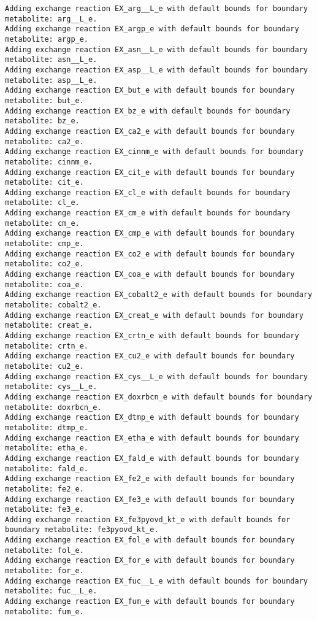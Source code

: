 \documentclass[
  letterpaper,
  DIV=11,
  numbers=noendperiod]{scrartcl}
\begin{document}
\begin{verbatim}
Adding exchange reaction EX_arg__L_e with default bounds for boundary metabolite: arg__L_e.
Adding exchange reaction EX_argp_e with default bounds for boundary metabolite: argp_e.
Adding exchange reaction EX_asn__L_e with default bounds for boundary metabolite: asn__L_e.
Adding exchange reaction EX_asp__L_e with default bounds for boundary metabolite: asp__L_e.
Adding exchange reaction EX_but_e with default bounds for boundary metabolite: but_e.
Adding exchange reaction EX_bz_e with default bounds for boundary metabolite: bz_e.
Adding exchange reaction EX_ca2_e with default bounds for boundary metabolite: ca2_e.
Adding exchange reaction EX_cinnm_e with default bounds for boundary metabolite: cinnm_e.
Adding exchange reaction EX_cit_e with default bounds for boundary metabolite: cit_e.
Adding exchange reaction EX_cl_e with default bounds for boundary metabolite: cl_e.
Adding exchange reaction EX_cm_e with default bounds for boundary metabolite: cm_e.
Adding exchange reaction EX_cmp_e with default bounds for boundary metabolite: cmp_e.
Adding exchange reaction EX_co2_e with default bounds for boundary metabolite: co2_e.
Adding exchange reaction EX_coa_e with default bounds for boundary metabolite: coa_e.
Adding exchange reaction EX_cobalt2_e with default bounds for boundary metabolite: cobalt2_e.
Adding exchange reaction EX_creat_e with default bounds for boundary metabolite: creat_e.
Adding exchange reaction EX_crtn_e with default bounds for boundary metabolite: crtn_e.
Adding exchange reaction EX_cu2_e with default bounds for boundary metabolite: cu2_e.
Adding exchange reaction EX_cys__L_e with default bounds for boundary metabolite: cys__L_e.
Adding exchange reaction EX_doxrbcn_e with default bounds for boundary metabolite: doxrbcn_e.
Adding exchange reaction EX_dtmp_e with default bounds for boundary metabolite: dtmp_e.
Adding exchange reaction EX_etha_e with default bounds for boundary metabolite: etha_e.
Adding exchange reaction EX_fald_e with default bounds for boundary metabolite: fald_e.
Adding exchange reaction EX_fe2_e with default bounds for boundary metabolite: fe2_e.
Adding exchange reaction EX_fe3_e with default bounds for boundary metabolite: fe3_e.
Adding exchange reaction EX_fe3pyovd_kt_e with default bounds for boundary metabolite: fe3pyovd_kt_e.
Adding exchange reaction EX_fol_e with default bounds for boundary metabolite: fol_e.
Adding exchange reaction EX_for_e with default bounds for boundary metabolite: for_e.
Adding exchange reaction EX_fuc__L_e with default bounds for boundary metabolite: fuc__L_e.
Adding exchange reaction EX_fum_e with default bounds for boundary metabolite: fum_e.

\end{verbatim}
\end{document}
